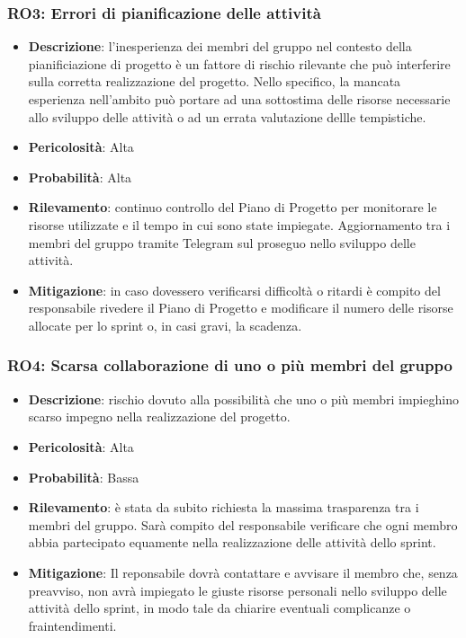 \documentclass[a4paper, 12pt]{article}
\begin{document}
\subsubsection{RO3: Errori di pianificazione delle attività}
\begin{itemize}
    \item \textbf{Descrizione}: l'inesperienza dei membri del gruppo nel contesto della pianificiazione di progetto è un fattore di rischio rilevante
    che può interferire sulla corretta realizzazione del progetto. Nello specifico, la mancata esperienza nell'ambito può portare ad una sottostima 
    delle risorse necessarie allo sviluppo delle attività o ad un errata valutazione dellle tempistiche. 
    \item \textbf{Pericolosità}: Alta
    \item \textbf{Probabilità}: Alta
    \item \textbf{Rilevamento}: continuo controllo del Piano di Progetto per monitorare le risorse utilizzate e il tempo in cui sono state impiegate.
    Aggiornamento tra i membri del gruppo tramite Telegram sul proseguo nello sviluppo delle attività.
    \item \textbf{Mitigazione}: in caso dovessero verificarsi difficoltà o ritardi è compito del responsabile rivedere il Piano di Progetto e 
    modificare il numero delle risorse allocate per lo sprint o, in casi gravi, la scadenza.
\end{itemize}
\subsubsection{RO4: Scarsa collaborazione di uno o più membri del gruppo}
\begin{itemize}
    \item \textbf{Descrizione}: rischio dovuto alla possibilità che uno o più membri impieghino scarso impegno nella realizzazione del progetto.
    \item \textbf{Pericolosità}: Alta
    \item \textbf{Probabilità}: Bassa
    \item \textbf{Rilevamento}: è stata da subito richiesta la massima trasparenza tra i membri del gruppo.
    Sarà compito del responsabile verificare che ogni membro abbia partecipato equamente nella realizzazione delle attività dello sprint.
    \item \textbf{Mitigazione}: Il reponsabile dovrà contattare e avvisare il membro che, senza preavviso, non avrà impiegato le giuste risorse personali nello sviluppo delle attività dello sprint,
    in modo tale da chiarire eventuali complicanze o fraintendimenti. 
\end{itemize}
\end{document}
